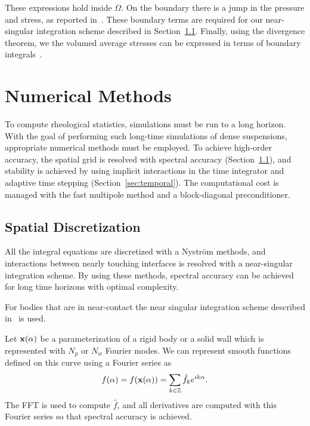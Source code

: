 \documentclass[preprint, 10pt]{elsarticle}
\begin{document}
These expressions hold inside $\Omega$. On the boundary there is a jump
in the pressure and stress, as reported in~\cite{Quaife2014}.  These
boundary terms are required for our near-singular integration scheme
described in Section~\ref{sec:spatial}.  Finally, using the divergence
theorem, we the volumed average stresses can be expressed in terms of
boundary integrals~\cite{Pozrikidis1992}. 
		
\section{Numerical Methods\label{s:method}} 

To compute rheological statistics, simulations must be run to a long horizon. With the goal of performing such long-time simulations of dense
suspensions, appropriate numerical methods must be employed.  To achieve
high-order accuracy, the spatial grid is resolved with spectral accuracy
(Section~\ref{sec:spatial}), and stability is achieved by using implicit
interactions in the time integrator and adaptive time stepping (Section~\ref{sec:temporal}). The computational cost is managed
with the fast multipole method
\cite{Greenbaum1992} and a
block-diagonal preconditioner.


\subsection{Spatial Discretization}\label{sec:spatial}

All the integral equations are discretized
with a Nystr\"om  methods, and interactions between nearly touching
interfaces is resolved with a near-singular integration scheme. By using
these methods, spectral accuracy can be achieved for long time horizons
with optimal complexity.

For bodies that are in near-contact the near singular
integration scheme described in~\cite{Quaife2014, Ying2006} is used.

Let ${\mathbf{x}}(\alpha)$ be a parameterization of a rigid body or a solid
wall which is represented with $N_p$ or $N_w$ Fourier modes. We can represent
smooth functions defined on this curve using a
Fourier series as
\begin{align}
  f(\alpha) = f({\mathbf{x}}(\alpha)) = \sum_{k \in {\mathbb{Z}}} \hat{f}_k e^{ik\alpha}.
\end{align}
The FFT is used to compute $\hat{f}$, and all derivatives are computed
with this Fourier series so that spectral accuracy is achieved.
\end{document}
